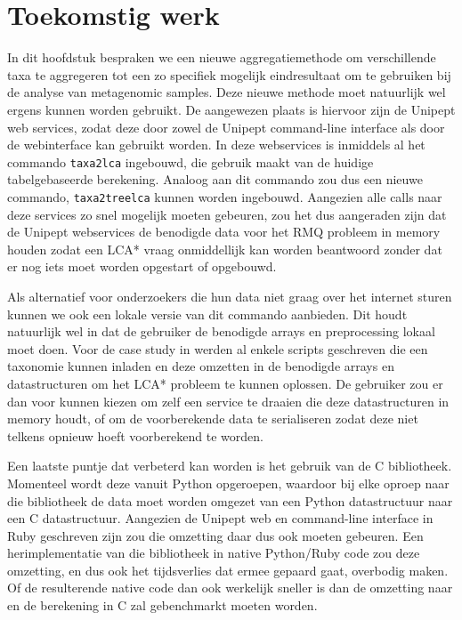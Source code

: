 \section{Toekomstig werk}

In dit hoofdstuk bespraken we een nieuwe aggregatiemethode om verschillende taxa
te aggregeren tot een zo specifiek mogelijk eindresultaat om te gebruiken bij de
analyse van metagenomic samples. Deze nieuwe methode moet natuurlijk wel ergens
kunnen worden gebruikt. De aangewezen plaats is hiervoor zijn de Unipept web
services, zodat deze door zowel de Unipept command-line interface als door de
webinterface kan gebruikt worden. In deze webservices is inmiddels al het
commando \texttt{taxa2lca}\cite{taxa2lca:online} ingebouwd, die gebruik maakt
van de huidige tabelgebaseerde berekening. Analoog aan dit commando zou dus een
nieuwe commando, \texttt{taxa2treelca} kunnen worden ingebouwd.  Aangezien alle
calls naar deze services zo snel mogelijk moeten gebeuren, zou het dus
aangeraden zijn dat de Unipept webservices de benodigde data voor het RMQ
probleem in memory houden zodat een LCA* vraag onmiddellijk kan worden
beantwoord zonder dat er nog iets moet worden opgestart of opgebouwd.

Als alternatief voor onderzoekers die hun data niet graag over het internet
sturen kunnen we ook een lokale versie van dit commando aanbieden. Dit houdt
natuurlijk wel in dat de gebruiker de benodigde arrays en preprocessing lokaal
moet doen. Voor de case study in  werden al enkele scripts
geschreven die een taxonomie kunnen inladen en deze omzetten in de benodigde
arrays en datastructuren om het LCA* probleem te kunnen oplossen. De gebruiker
zou er dan voor kunnen kiezen om zelf een service te draaien die deze
datastructuren in memory houdt, of om de voorberekende data te serialiseren
zodat deze niet telkens opnieuw hoeft voorberekend te worden.

Een laatste puntje dat verbeterd kan worden is het gebruik van de C bibliotheek.
Momenteel wordt deze vanuit Python opgeroepen, waardoor bij elke oproep naar die
bibliotheek de data moet worden omgezet van een Python datastructuur naar een C
datastructuur. Aangezien de Unipept web en command-line interface in Ruby
geschreven zijn zou die omzetting daar dus ook moeten gebeuren. Een
herimplementatie van die bibliotheek in native Python/Ruby code zou deze
omzetting, en dus ook het tijdsverlies dat ermee gepaard gaat, overbodig maken.
Of de resulterende native code dan ook werkelijk sneller is dan de omzetting
naar en de berekening in C zal gebenchmarkt moeten worden.